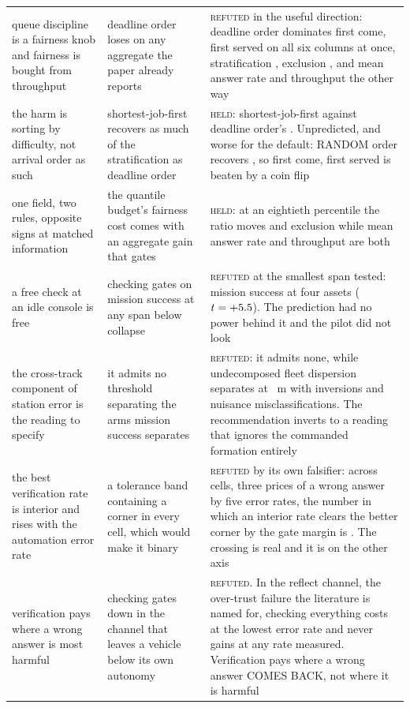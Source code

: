 \begin{tabular}{@{}p{}p{}p{}@{}}
queue discipline is a fairness knob and fairness is bought from throughput & deadline order loses on any aggregate the paper already reports & \textsc{refuted} in the useful direction: deadline order dominates first come, first served on all six columns at once, stratification \FrEdfRatio{}, exclusion \FrEdfStarv{}, and mean answer rate \FrEdfRate{} and throughput \FrEdfSrv{} the other way \\
the harm is sorting by difficulty, not arrival order as such & shortest-job-first recovers as much of the stratification as deadline order & \textsc{held}: shortest-job-first \FrEasyRatio{} against deadline order's \FrEdfRatio{}. Unpredicted, and worse for the default: RANDOM order recovers \FrRandRatio{}, so first come, first served is beaten by a coin flip \\
one field, two rules, opposite signs at matched information & the quantile budget's fairness cost comes with an aggregate gain that gates & \textsc{held}: at an eightieth percentile the ratio moves \FqQEightyRatio{} and exclusion \FqQEightyStarv{} while mean answer rate and throughput are both \FqQEightyRateV{} \\
a free check at an idle console is free & checking gates on mission success at any span below collapse & \textsc{refuted} at the smallest span tested: \TrLow{} mission success at four assets ($t = +5.5{}$). The prediction had no power behind it and the pilot did not look \\
the cross-track component of station error is the reading to specify & it admits no threshold separating the arms mission success separates & \textsc{refuted}: it admits none, while undecomposed fleet dispersion separates at \DsSpreadThresh{}~m with \DsSpreadInv{} inversions and \DbSpreadMiss{} nuisance misclassifications. The recommendation inverts to a reading that ignores the commanded formation entirely \\
the best verification rate is interior and rises with the automation error rate & a tolerance band containing a corner in every cell, which would make it binary & \textsc{refuted} by its own falsifier: across \DrCells{} cells, three prices of a wrong answer by five error rates, the number in which an interior rate clears the better corner by the gate margin is \DrInterior{}. The crossing is real and it is on the other axis \\
verification pays where a wrong answer is most harmful & checking gates down in the channel that leaves a vehicle below its own autonomy & \textsc{refuted}. In the reflect channel, the over-trust failure the literature is named for, checking everything costs \DrReflLo{} at the lowest error rate and never gains at any rate measured. Verification pays where a wrong answer COMES BACK, not where it is harmful \\

\end{tabular}
